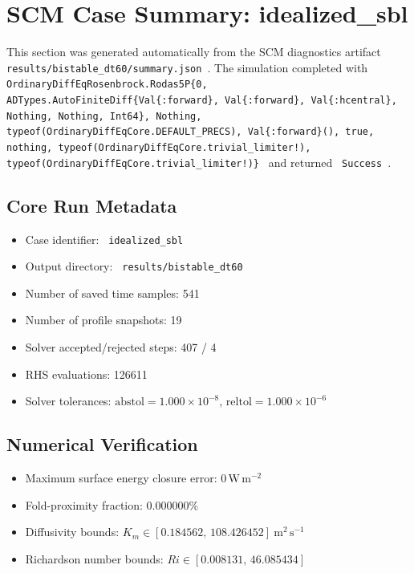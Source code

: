 \section{SCM Case Summary: idealized\_sbl}
\label{sec:scm_case_bistable_dt60_idealized_sbl_100x2m_9h_report}

This section was generated automatically from the SCM diagnostics artifact
\texttt{ results/bistable\_dt60/summary.json }. The simulation completed with \texttt{ OrdinaryDiffEqRosenbrock.Rodas5P\{0, ADTypes.AutoFiniteDiff\{Val\{:forward\}, Val\{:forward\}, Val\{:hcentral\}, Nothing, Nothing, Int64\}, Nothing, typeof(OrdinaryDiffEqCore.DEFAULT\_PRECS), Val\{:forward\}(), true, nothing, typeof(OrdinaryDiffEqCore.trivial\_limiter!), typeof(OrdinaryDiffEqCore.trivial\_limiter!)\} }
and returned \texttt{ Success }.

\subsection{Core Run Metadata}
\begin{itemize}
  \item Case identifier: \texttt{ idealized\_sbl }
  \item Output directory: \texttt{ results/bistable\_dt60 }
  \item Number of saved time samples: 541
  \item Number of profile snapshots: 19
  \item Solver accepted/rejected steps: 407 / 4
  \item RHS evaluations: 126611
  \item Solver tolerances: $\mathrm{abstol}=1.000 \times 10^{-8}$, $\mathrm{reltol}=1.000 \times 10^{-6}$
\end{itemize}

\subsection{Numerical Verification}
\begin{itemize}
  \item Maximum surface energy closure error:
  $0\,\mathrm{W\,m^{-2}}$
  \item Fold-proximity fraction:
  $0.000000\%$
  \item Diffusivity bounds:
  $K_m \in [0.184562,\,108.426452]~\mathrm{m^2\,s^{-1}}$
  \item Richardson number bounds:
  $Ri \in [0.008131,\,46.085434]$
\end{itemize}


